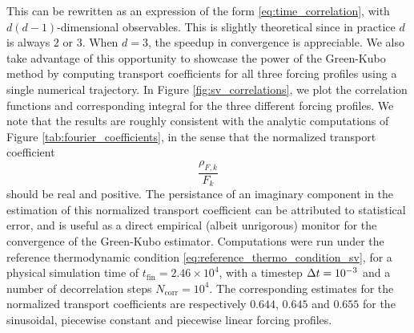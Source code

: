 This can be rewritten as an expression of the form \eqref{eq:time_correlation}, with $d(d-1)$-dimensional observables. 
This is slightly theoretical since in practice $d$ is always $2$ or $3$. When $d=3$, the speedup in convergence is appreciable. 
We also take advantage of this opportunity to showcase the power of the Green-Kubo method by computing transport coefficients for all three forcing profiles using a single numerical trajectory.
In Figure \eqref{fig:sv_correlations}, we plot the correlation functions and corresponding integral for the three different forcing profiles.
We note that the results are roughly consistent with the analytic computations of Figure \ref{tab:fourier_coefficients}, in the sense that the normalized transport coefficient 
\[\frac{\rho_{F,k}}{F_k}\]
should be real and positive. 
The persistance of an imaginary component in the estimation of this normalized transport coefficient can be attributed to statistical error, and is useful as a direct empirical (albeit unrigorous) monitor for the convergence of the Green-Kubo estimator.
Computations were run under the reference thermodynamic condition \eqref{eq:reference_thermo_condition_sv}, for a physical simulation time of $t_{\mathrm{fin}}=2.46\times 10^4$, with a timestep ${\Delta t}=10^{-3}$ and a number of decorrelation steps $N_{\mathrm{corr}}=10^4$.
The corresponding estimates for the normalized transport coefficients are respectively $0.644$, $0.645$ and $0.655$ for the sinusoidal, piecewise constant and piecewise linear forcing profiles.


